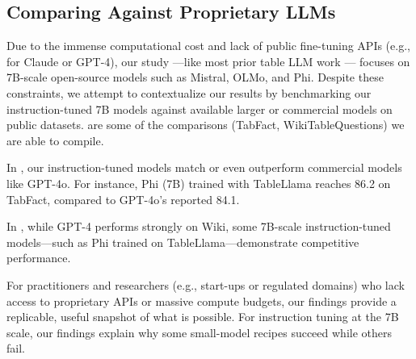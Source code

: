 \documentclass[11pt]{article}
\begin{document}
\subsection{Comparing Against Proprietary LLMs}
\label{app-subsec: compare-propriety-llms}

Due to the immense computational cost and lack of public fine-tuning APIs (e.g., for Claude or GPT-4), our study —like most prior table LLM work \citep{zhang-etal-2024-tablellama} — focuses on 7B-scale open-source models such as Mistral, OLMo, and Phi. 
Despite these constraints, we attempt to contextualize our results by benchmarking our instruction-tuned 7B models against available larger or commercial models on public datasets.
 are some of the comparisons (TabFact, WikiTableQuestions) we are able to compile.

In , our instruction-tuned models match or even outperform commercial models like GPT-4o. 
For instance, Phi (7B) trained with TableLlama reaches 86.2 on TabFact, compared to GPT-4o’s reported 84.1.

In , while GPT-4 performs strongly on Wiki, some 7B-scale instruction-tuned models—such as Phi trained on TableLlama—demonstrate competitive performance.

For practitioners and researchers (e.g., start-ups or regulated domains) who lack access to proprietary APIs or massive compute budgets, our findings provide a replicable, useful snapshot of what is possible. 
For instruction tuning at the 7B scale, our findings explain why some small-model recipes succeed while others fail.
\end{document}
